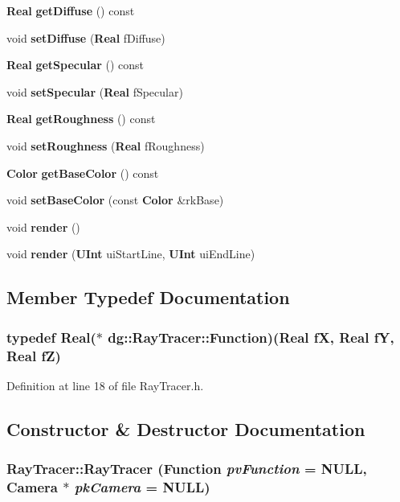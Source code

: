 \begin{CompactItemize}
{\bf Real} {\bf get\-Diffuse} () const
\item 
void {\bf set\-Diffuse} ({\bf Real} f\-Diffuse)
\item 
{\bf Real} {\bf get\-Specular} () const
\item 
void {\bf set\-Specular} ({\bf Real} f\-Specular)
\item 
{\bf Real} {\bf get\-Roughness} () const
\item 
void {\bf set\-Roughness} ({\bf Real} f\-Roughness)
\item 
{\bf Color} {\bf get\-Base\-Color} () const
\item 
void {\bf set\-Base\-Color} (const {\bf Color} \&rk\-Base)
\item 
void {\bf render} ()
\item 
void {\bf render} ({\bf UInt} ui\-Start\-Line, {\bf UInt} ui\-End\-Line)
\end{CompactItemize}


\subsection{Member Typedef Documentation}
\subsubsection{\setlength{\rightskip}{0pt plus 5cm}typedef {\bf Real}($\ast$ dg::Ray\-Tracer::Function)({\bf Real} f\-X, {\bf Real} f\-Y, {\bf Real} f\-Z)}\label{classdg_1_1RayTracer_s0}




Definition at line 18 of file Ray\-Tracer.h.

\subsection{Constructor \& Destructor Documentation}
\subsubsection{\setlength{\rightskip}{0pt plus 5cm}Ray\-Tracer::Ray\-Tracer ({\bf Function} {\em pv\-Function} = NULL, {\bf Camera} $\ast$ {\em pk\-Camera} = NULL)}\label{classdg_1_1RayTracer_a0}




